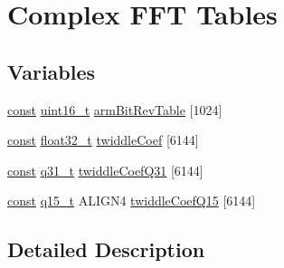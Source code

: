 \hypertarget{group___c_f_f_t___c_i_f_f_t}{\section{Complex F\-F\-T Tables}
\label{group___c_f_f_t___c_i_f_f_t}
}
\subsection*{Variables}
\begin{DoxyCompactItemize}
\item 
\hyperlink{group___n_a_m_e_ga7ae6d0e43244213b34de2c2b9aa30da6}{const} \hyperlink{stdint_8h_a273cf69d639a59973b6019625df33e30}{uint16\-\_\-t} \hyperlink{group___c_f_f_t___c_i_f_f_t_gae247e83ad50d474107254e25b36ad42b}{arm\-Bit\-Rev\-Table} \mbox{[}1024\mbox{]}
\item 
\hyperlink{group___n_a_m_e_ga7ae6d0e43244213b34de2c2b9aa30da6}{const} \hyperlink{arm__math_8h_a4611b605e45ab401f02cab15c5e38715}{float32\-\_\-t} \hyperlink{group___c_f_f_t___c_i_f_f_t_gaa29400b1efb778cd88c3ba1bb19eb339}{twiddle\-Coef} \mbox{[}6144\mbox{]}
\item 
\hyperlink{group___n_a_m_e_ga7ae6d0e43244213b34de2c2b9aa30da6}{const} \hyperlink{arm__math_8h_adc89a3547f5324b7b3b95adec3806bc0}{q31\-\_\-t} \hyperlink{group___c_f_f_t___c_i_f_f_t_ga80f8f038faf4289eebc59dd5fa010993}{twiddle\-Coef\-Q31} \mbox{[}6144\mbox{]}
\item 
\hyperlink{group___n_a_m_e_ga7ae6d0e43244213b34de2c2b9aa30da6}{const} \hyperlink{arm__math_8h_ab5a8fb21a5b3b983d5f54f31614052ea}{q15\-\_\-t} A\-L\-I\-G\-N4 \hyperlink{group___c_f_f_t___c_i_f_f_t_ga39e78f61a5f4bd5cfb577b11099a2c7f}{twiddle\-Coef\-Q15} \mbox{[}6144\mbox{]}
\end{DoxyCompactItemize}


\subsection{Detailed Description}



